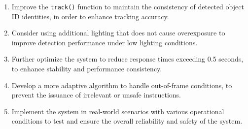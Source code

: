 \begin{enumerate}
  \item Improve the \texttt{track()} function to maintain the consistency of detected object ID identities, in order to enhance tracking accuracy.
  \item Consider using additional lighting that does not cause overexposure to improve detection performance under low lighting conditions.
  \item Further optimize the system to reduce response times exceeding 0.5 seconds, to enhance stability and performance consistency.
  \item Develop a more adaptive algorithm to handle out-of-frame conditions, to prevent the issuance of irrelevant or unsafe instructions.
  \item Implement the system in real-world scenarios with various operational conditions to test and ensure the overall reliability and safety of the system.
\end{enumerate}

